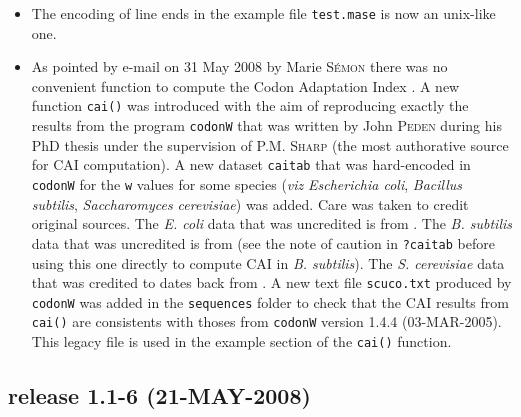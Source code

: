 \documentclass{article}
\begin{document}
\begin{itemize}
\item The encoding of line ends in the example file \texttt{test.mase}
  is now an unix-like one.

\item As pointed by e-mail on 31 May 2008 by Marie \textsc{S{\'e}mon} there was
  no convenient function to compute the Codon Adaptation Index \cite{CAI}.
  A new function \texttt{cai()} was introduced with the aim of reproducing
  exactly the results from the program \texttt{codonW} that was written
  by John \textsc{Peden} during his PhD thesis \cite{codonW} under the supervision
  of P.M. \textsc{Sharp} (the most authorative source for CAI computation). A new
  dataset \texttt{caitab} that was hard-encoded in \texttt{codonW} for
  the \texttt{w} values for some species (\textit{viz}
  \textit{Escherichia coli}, \textit{Bacillus subtilis},
  \textit{Saccharomyces cerevisiae}) was added. Care was taken to credit
  original sources. The \textit{E. coli} data that was uncredited is
  from \cite{CAI}. The \textit{B. subtilis} data that was uncredited
  is from \cite{ShieldsDC1987} (see the note of caution in \texttt{?caitab}
  before using this one directly to compute CAI in \textit{B. subtilis}).
  The \textit{S. cerevisiae} data that was
  credited to \cite{SharpPM1991} dates back from \cite{CAI}. A new
  text file \texttt{scuco.txt} produced by \texttt{codonW} was added
  in the \texttt{sequences} folder to check that the CAI results from
  \texttt{cai()} are consistents with thoses from \texttt{codonW} version
  1.4.4 (03-MAR-2005). This legacy file is used in the example section of
  the \texttt{cai()} function.

\end{itemize}

\subsection*{release 1.1-6 (21-MAY-2008)}
\end{document}
